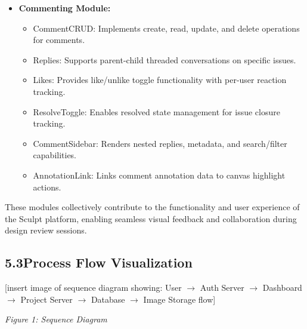 \documentclass[12pt,a4paper]{article}
\begin{document}
\begin{itemize}
    \item[\textbf{$\triangleright$}] \textbf{Commenting Module:}
    \begin{itemize}
        \item CommentCRUD: Implements create, read, update, and delete operations for comments.
        \item Replies: Supports parent-child threaded conversations on specific issues.
        \item Likes: Provides like/unlike toggle functionality with per-user reaction tracking.
        \item ResolveToggle: Enables resolved state management for issue closure tracking.
        \item CommentSidebar: Renders nested replies, metadata, and search/filter capabilities.
        \item AnnotationLink: Links comment annotation data to canvas highlight actions.
    \end{itemize}
\end{itemize}

These modules collectively contribute to the functionality and user experience of the Sculpt platform, enabling seamless visual feedback and collaboration during design review sessions.

\subsection{5.3\quad Process Flow Visualization}

[insert image of sequence diagram showing: User $\rightarrow$ Auth Server $\rightarrow$ Dashboard $\rightarrow$ Project Server $\rightarrow$ Database $\rightarrow$ Image Storage flow]

\textit{Figure 1: Sequence Diagram}
\end{document}
